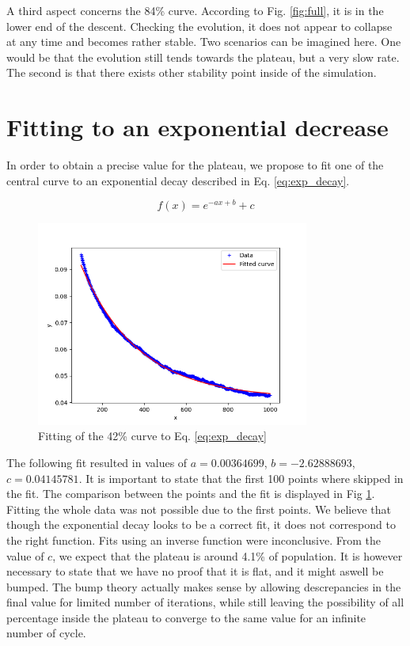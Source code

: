 \documentclass{article}
\begin{document}
A third aspect concerns the 84\% curve. According to Fig. \ref*{fig:full}, it is in the lower end
of the descent. Checking the evolution, it does not appear to collapse at any time and becomes rather stable.
Two scenarios can be imagined here. One would be that the evolution still tends towards the plateau,
but a very slow rate. The second is that there exists other stability point inside of the simulation.


\section{Fitting to an exponential decrease}
In order to obtain a precise value for the plateau, we propose to fit one of the central
curve to an exponential decay described in Eq. \ref*{eq:exp_decay}.

\begin{equation}
    f(x) = e^{-ax + b} + c
    \label{eq:exp_decay}
\end{equation}

\begin{figure}[htbp]
    \centering
    \includegraphics[width=0.8\textwidth]{res/fit.png}
    \caption{Fitting of the 42\% curve to Eq. \ref*{eq:exp_decay}}
    \label{fig:decay_fit}
\end{figure}

The following fit resulted in values of $a=0.00364699$, $b=-2.62888693$,
$c=0.04145781$. It is important to state that the first 100 points where skipped
in the fit. The comparison between the points and the fit is displayed in 
Fig \ref*{fig:decay_fit}. Fitting the whole data was not possible due to the first points.
We believe that though the exponential decay looks to be a correct fit, it
does not correspond to the right function. Fits using an inverse function were
inconclusive. From the value of $c$, we expect that the plateau is around 4.1\%
of population. It is however necessary to state that we have no proof that it is
flat, and it might aswell be bumped. The bump theory actually makes sense by allowing
descrepancies in the final value for limited number of iterations, while still leaving the 
possibility of all percentage inside the plateau to converge to the same value for an infinite number
of cycle. 
\vspace{\baselineskip}
\end{document}
